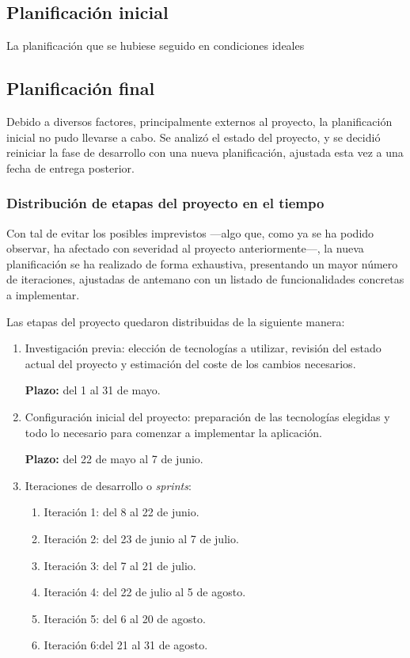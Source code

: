 \documentclass[10pt, a4paper]{aqademic}
\begin{document}
\subsection{Planificación inicial}

La planificación que se hubiese seguido en condiciones ideales

\subsection{Planificación final}

Debido a diversos factores, principalmente externos al proyecto, la planificación inicial no pudo llevarse a cabo. Se analizó el estado del proyecto, y se decidió reiniciar la fase de desarrollo con una nueva planificación, ajustada esta vez a una fecha de entrega posterior.

\subsubsection*{Distribución de etapas del proyecto en el tiempo}

Con tal de evitar los posibles imprevistos ---algo que, como ya se ha podido observar, ha afectado con severidad al proyecto anteriormente---, la nueva planificación se ha realizado de forma exhaustiva, presentando un mayor número de iteraciones, ajustadas de antemano con un listado de funcionalidades concretas a implementar.

Las etapas del proyecto quedaron distribuidas de la siguiente manera:

\begin{enumerate}
	\item Investigación previa: elección de tecnologías a utilizar, revisión del estado actual del proyecto y estimación del coste de los cambios necesarios.
	
	\textbf{Plazo:} del 1 al 31 de mayo. 
	
	\item Configuración inicial del proyecto: preparación de las tecnologías elegidas y todo lo necesario para comenzar a implementar la aplicación.
	
	\textbf{Plazo:} del 22 de mayo al 7 de junio.
	
	\item Iteraciones de desarrollo o \textit{sprints}: 
	\begin{enumerate}
		\item Iteración 1: del 8 al 22 de junio.
		
		\item Iteración 2: del 23 de junio al  7 de julio.
		
		\item Iteración 3: del 7 al 21 de julio.
		
		\item Iteración 4: del 22 de julio al 5 de agosto.
		
		\item Iteración 5: del 6 al 20 de agosto.
		
		\item Iteración 6:del 21 al 31 de agosto.
	\end{enumerate}
\end{enumerate}
\end{document}
